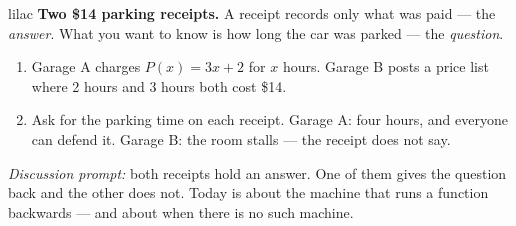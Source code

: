 \documentclass[10pt]{article}
\begin{document}
\begin{skillbox}[Hook]{lilac}
    \textbf{Two \$14 parking receipts.} A receipt records only what was paid ---
    the \textit{answer}. What you want to know is how long the car was parked
    --- the \textit{question}.
    \begin{enumerate}[itemsep=2pt]
        \item Garage A charges $P(x) = 3x + 2$ for $x$ hours. Garage B posts a
              price list where 2 hours and 3 hours both cost \$14.
        \item Ask for the parking time on each receipt. Garage A: four hours,
              and everyone can defend it. Garage B: the room stalls --- the
              receipt does not say.
    \end{enumerate}
    \textit{Discussion prompt:} both receipts hold an answer. One of them gives
    the question back and the other does not. Today is about the machine that
    runs a function backwards --- and about when there is no such machine.
\end{skillbox}
\end{document}
